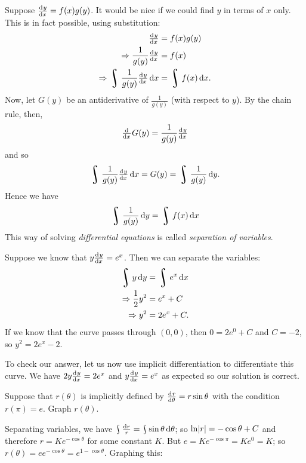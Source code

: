 


Suppose $ \od{y}{x} = f(x) g(y) $. It would be nice if we could find $ y $ in terms of $ x $ only. This
is in fact possible, using substitution:
\begin{align*}
  \od{y}{x} &= f(x) g(y) \\
  \Rightarrow \frac{1}{g(y)} \od{y}{x} &= f(x)\\
  \Rightarrow \rint \frac{1}{g(y)} \od{y}{x} \dif{x} &= \rint f(x) \dif{x}.
\end{align*}
Now, let $ G(y) $ be an antiderivative of $ \frac{1}{g(y)} $ (with respect to $ y $). By the chain rule, then,
\begin{displaymath}
  \od{}{x} G(y) = \frac{1}{g(y)} \od{y}{x}
\end{displaymath}
and so
\begin{displaymath}
  \rint \frac{1}{g(y)} \od{y}{x} \dif{x} = G(y) = \rint \frac{1}{g(y)} \dif{y}.
\end{displaymath}
Hence we have
\begin{displaymath}
  \rint \frac{1}{g(y)} \dif{y} = \rint f(x) \dif{x}
\end{displaymath}
This way of solving \textit{differential equations} is called \textit{separation of variables}.

\begin{ex}
  Suppose we know that $ y\od{y}{x} = e^x $. Then we can separate the variables:
  \begin{align*}
    \rint y \dif{y} &= \rint e^x \dif{x}\\
    \Rightarrow \frac{1}{2} y^2 &= e^x + C\\
    \Rightarrow y^2 &= 2e^x + C.
  \end{align*}
  If we know that the curve passes through $ (0,0) $, then $ 0 = 2e^0 + C $ and $ C = -2 $, so $ y^2 = 2e^x - 2 $.

  To check our answer, let us now use implicit differentiation to differentiate this curve. We have $ 2y \od{y}{x} = 2e^x $ and $ y \od{y}{x} = e^x $
  as expected so our solution is correct.
\end{ex}

\begin{ex}
  Suppose that $ r(\theta) $ is implicitly defined by $ \od{r}{\theta} = r \sin \theta $ with the condition $ r(\pi) = e $.
  Graph $ r(\theta) $.

  Separating variables, we have $ \rint \frac{\dif{r}}{r} = \rint \sin \theta \dif{\theta} $; so $ \ln \abs{r} = -\cos \theta + C $
  and therefore $ r = Ke^{-\cos \theta} $ for some constant $ K $. But $ e = Ke^{-\cos \pi} = Ke^0 = K $; so $ r(\theta) = e e^{-\cos \theta} = e^{1 - \cos \theta} $.
  Graphing this:
  \begin{center}
  \end{center}
\end{ex}

